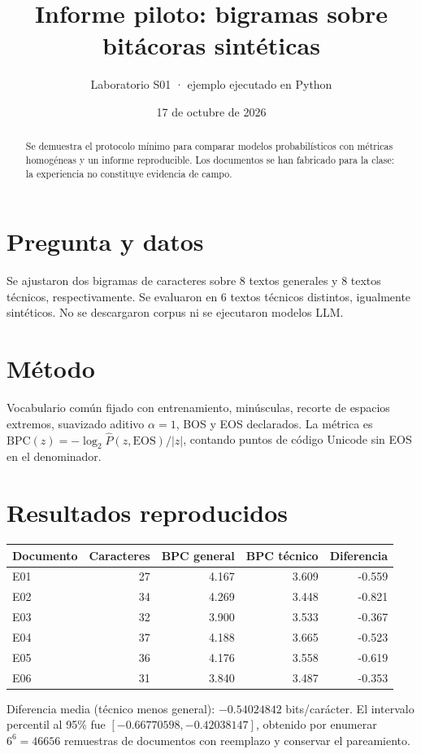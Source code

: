\documentclass[11pt,a4paper]{article}
\title{Informe piloto: bigramas sobre bitácoras sintéticas}
\author{Laboratorio S01 · ejemplo ejecutado en Python}
\date{17 de octubre de 2026}
\begin{document}
\maketitle
\begin{abstract}
Se demuestra el protocolo mínimo para comparar modelos probabilísticos con
métricas homogéneas y un informe reproducible. Los documentos se han
fabricado para la clase: la experiencia no constituye evidencia de campo.
\end{abstract}
\section{Pregunta y datos}
Se ajustaron dos bigramas de caracteres sobre 8 textos generales y 8 textos
técnicos, respectivamente. Se evaluaron en 6 textos técnicos distintos,
igualmente sintéticos. No se descargaron corpus ni se ejecutaron modelos LLM.
\section{Método}
Vocabulario común fijado con entrenamiento, minúsculas, recorte de espacios
extremos, suavizado aditivo $\alpha=1$, BOS y EOS declarados. La métrica es
$\mathrm{BPC}(z)=-\log_2\widehat P(z,\mathrm{EOS})/|z|$,
contando puntos de código Unicode sin EOS en el denominador.
\section{Resultados reproducidos}
\begin{center}\begin{tabular}{lrrrr}\toprule
Documento & Caracteres & BPC general & BPC técnico & Diferencia\\\midrule
E01 & 27 & 4.167 & 3.609 & -0.559 \\
E02 & 34 & 4.269 & 3.448 & -0.821 \\
E03 & 32 & 3.900 & 3.533 & -0.367 \\
E04 & 37 & 4.188 & 3.665 & -0.523 \\
E05 & 36 & 4.176 & 3.558 & -0.619 \\
E06 & 31 & 3.840 & 3.487 & -0.353 \\
\bottomrule\end{tabular}\end{center}

\noindent Diferencia media (técnico menos general): $-0.54024842$ bits/carácter. El intervalo percentil al 95\% fue
$[-0.66770598,-0.42038147]$, obtenido por enumerar
$6^6=46656$ remuestras de documentos con reemplazo y conservar el pareamiento.
\end{document}
